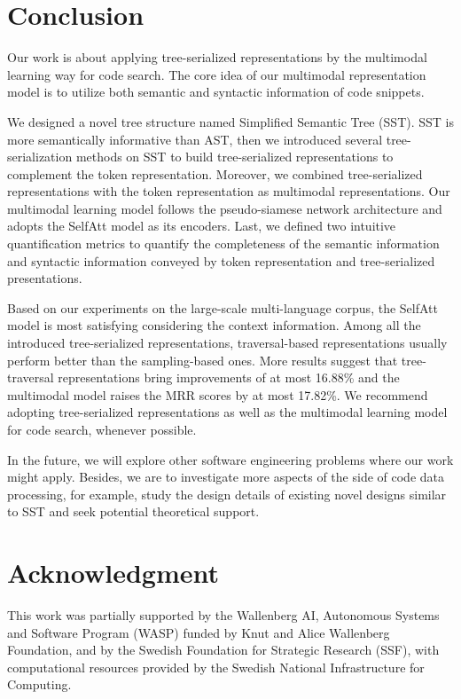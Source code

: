 \documentclass[conference]{IEEEtran}
\begin{document}
 \section{Conclusion}
\label{sec:conclusion}

Our work is about applying tree-serialized representations by the multimodal learning way for code search. The core idea of our multimodal representation model is to utilize both semantic and syntactic information of code snippets.

We designed a novel tree structure named Simplified Semantic Tree (SST). SST is more semantically informative than AST, then we introduced several tree-serialization methods on SST to build tree-serialized representations to complement the token representation. Moreover, we combined tree-serialized representations with the token representation as multimodal representations. Our multimodal learning model follows the pseudo-siamese network architecture and adopts the SelfAtt model as its encoders. Last, we defined two intuitive quantification metrics to quantify the completeness of the semantic information and syntactic information conveyed by token representation and tree-serialized presentations.

Based on our experiments on the large-scale multi-language corpus, the SelfAtt model is most satisfying considering the context information. Among all the introduced tree-serialized representations, traversal-based representations usually perform better than the sampling-based ones. More results suggest that tree-traversal representations bring improvements of at most 16.88\% and the multimodal model raises the MRR scores by at most 17.82\%. We recommend adopting tree-serialized representations as well as the multimodal learning model for code search, whenever possible.

In the future, we will explore other software engineering problems where our work might apply. Besides, we are to investigate more aspects of the side of code data processing, for example, study the design details of existing novel designs similar to SST and seek potential theoretical support.



 
\section*{Acknowledgment}

This work was partially supported by the Wallenberg AI, Autonomous Systems and Software Program (WASP) funded by Knut and Alice Wallenberg Foundation, and by the Swedish Foundation for Strategic Research (SSF), with computational resources provided by the Swedish National Infrastructure for Computing.

\newpage

\printbibliography[heading=bibintoc]
\end{document}
